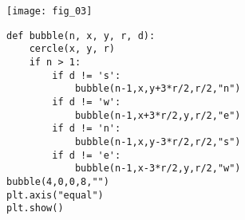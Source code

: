 \begin{marginfigure}
\texttt{[image: fig\_03]}
\end{marginfigure}


\begin{lstlisting}
def bubble(n, x, y, r, d):
    cercle(x, y, r)
    if n > 1:
        if d != 's':
            bubble(n-1,x,y+3*r/2,r/2,"n")
        if d != 'w':
            bubble(n-1,x+3*r/2,y,r/2,"e")
        if d != 'n':
            bubble(n-1,x,y-3*r/2,r/2,"s")
        if d != 'e':
            bubble(n-1,x-3*r/2,y,r/2,"w")
bubble(4,0,0,8,"")
plt.axis("equal")
plt.show()
\end{lstlisting}
%
%



